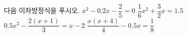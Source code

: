 다음 이차방정식을 푸시오.
 $x^2-0.2x-\dfrac{2}{5}=0$
 $\dfrac{1}{6}x^2+\dfrac{3}{2}x=1.5$
 $0.5x^2-\dfrac{2(x+1)}{3}=x-2$
 $\dfrac{x(x+4)}{4}-0.5x=\dfrac{1}{8}$
